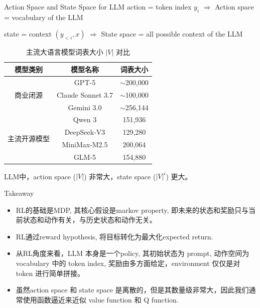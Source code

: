 \documentclass[aspectratio=169]{beamer}
\begin{document}
\begin{frame}{Action Space and State Space for LLM}
    action = token index $y_i$ $\Rightarrow$ Action space = vocabulary of the LLM

    state = context $(y_{<i}, x)$ $\Rightarrow$ State space = all possible context of the LLM

    \begin{table}[h!]
        \small
        \centering
        \caption{主流大语言模型词表大小 $|V|$ 对比}
        \label{tab:vocab-size}
        \begin{tabular}{ccc}
          \toprule
          模型类别 & 模型名称 & 词表大小 \\
          \midrule
          \multirow{3}{*}{商业闭源} & GPT-5 & $\sim$200,000 \\
                           & Claude Sonnet 3.7 & $\sim$100,000 \\
                           & Gemini 3.0 & $\sim$256,144 \\
          \midrule
          \multirow{4}{*}{主流开源模型} & Qwen 3 & 151,936 \\
                              & DeepSeek-V3 & 129,280 \\
                              & MiniMax-M2.5 & 200,064 \\
                              & GLM-5 & 154,880 \\
          \bottomrule
        \end{tabular}
      \end{table}
    LLM中，action space ($|V|$) 非常大，state space ($|V|^i$) 更大。
\end{frame}

\begin{frame}{Takeaway}
    \begin{itemize}
        \item RL的基础是MDP, 其核心假设是markov property, 即未来的状态和奖励只与当前状态和动作有关，与历史状态和动作无关。
        \item RL通过reward hypothesis, 将目标转化为最大化expected return.
        \item 从RL角度来看，LLM 本身是一个policy, 其初始状态为 prompt, 动作空间为 vocabulary 中的 token index, 奖励由多方面给定，environment 仅仅是对 token 进行简单拼接。
        \item 虽然action space 和 state space 是离散的，但是其数量级非常大，因此我们通常使用函数逼近来近似 value function 和 Q function.
    \end{itemize}
\end{frame}
\end{document}
